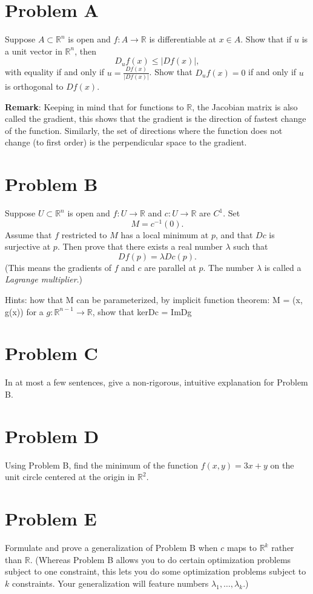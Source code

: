 \documentclass[lang=cn,11pt]{template}
\begin{document}
\section*{Problem A}
Suppose $A \subset \mathbb{R}^n$ is open and $f : A \to \mathbb{R}$ is differentiable at $x \in A$. Show that if $u$ is a unit vector in $\mathbb{R}^n$, then
\[
D_u f(x) \leq |Df(x)|,
\]
with equality if and only if $u = \frac{Df(x)}{|Df(x)|}$. Show that $D_u f(x) = 0$ if and only if $u$ is orthogonal to $Df(x)$.

\textbf{Remark}: Keeping in mind that for functions to $\mathbb{R}$, the Jacobian matrix is also called the gradient, this shows that the gradient is the direction of fastest change of the function. Similarly, the set of directions where the function does not change (to first order) is the perpendicular space to the gradient.

\section*{Problem B}
Suppose $U \subset \mathbb{R}^n$ is open and $f : U \to \mathbb{R}$ and $c : U \to \mathbb{R}$ are $C^1$. Set
\[
M = c^{-1}(0).
\]
Assume that $f$ restricted to $M$ has a local minimum at $p$, and that $Dc$ is surjective at $p$. Then prove that there exists a real number $\lambda$ such that
\[
Df(p) = \lambda Dc(p).
\]
(This means the gradients of $f$ and $c$ are parallel at $p$. The number $\lambda$ is called a \textit{Lagrange multiplier}.)

Hints: how that M can be parameterized, by implicit function theorem: M = {(x, g(x))} for a $g: \mathbb{R}^{n-1} \rightarrow \mathbb{R}$, show that kerDc = ImDg


\section*{Problem C}
In at most a few sentences, give a non-rigorous, intuitive explanation for Problem B.

\section*{Problem D}
Using Problem B, find the minimum of the function $f(x, y) = 3x + y$ on the unit circle centered at the origin in $\mathbb{R}^2$.

\section*{Problem E}
Formulate and prove a generalization of Problem B when $c$ maps to $\mathbb{R}^k$ rather than $\mathbb{R}$. (Whereas Problem B allows you to do certain optimization problems subject to one constraint, this lets you do some optimization problems subject to $k$ constraints. Your generalization will feature numbers $\lambda_1, \dots, \lambda_k$.)
\end{document}
